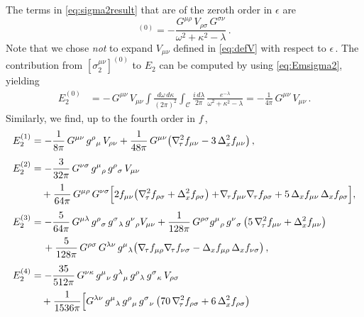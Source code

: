 \documentclass[11pt]{article}
\newcommand{\be}{\begin{equation}}
\newcommand{\ee}{\end{equation}}
\newcommand{\CC}{\mathcal{C}}
\newcommand{\lr}{\left (}
\newcommand{\rr}{\right )}
\begin{document}
The terms in \eqref{eq:sigma2result} that are of the zeroth order in $\epsilon$ are
%
\be
	[\sigma^{\mu\nu}_2]^{(0)} = - \frac{G^{\mu\rho} \, V_{\rho\sigma} \, G^{\sigma\nu}}{\omega^2 + \kappa^2 - \lambda}\,.
\ee
%
Note that we chose \emph{not} to expand $V_{\mu\nu}$ defined in \eqref{eq:defV} with respect to $\epsilon$\,. The contribution from $[\sigma_2^{\mu\nu}]^{(0)}$ to $E_2$ can be computed by using \eqref{eq:Emsigma2}, yielding
%
\begin{align}
	E_2^{(0)} & = - \, G^{\mu\nu} \, V_{\mu\nu} \int \frac{d\omega \, d\kappa}{(2\pi)^2} \int_\CC \frac{i \, d\lambda}{2\pi} \, \frac{e^{-\lambda}}{\omega^2 + \kappa^2 - \lambda}		
		= - \frac{1}{4\pi} \, G^{\mu\nu} \, V_{\mu\nu}\,.
\end{align}
%
Similarly, we find, up to the fourth order in $f$\,, 
%
\begin{subequations} \label{eq:E214}
\begin{align}
	E_2^{(1)} & = - \frac{1}{8\pi} \, G^{\mu\nu} \, g^{\rho}{}_\mu \, V_{\rho\nu} + \frac{1}{48 \pi} \, G^{\mu\nu} \! \lr \nabla_{\!\tau}^2 f_{\mu\nu} - 3 \, \Delta_x^2 f_{\mu\nu} \rr, \\[4pt]
	E_2^{(2)} & = - \frac{3}{32 \pi} \, G^{\nu\sigma} \, g^{\mu}{}_{\rho} \, g^{\rho}{}_{\sigma} \, V_{\mu\nu} \notag \\[2pt]
	 	& \quad + \frac{1}{64\pi} \, G^{\mu\rho} \, G^{\nu\sigma} \Bigl[ 2 f_{\mu\nu} \bigl( \nabla_{\!\tau}^2 f_{\rho\sigma} + \Delta_x^2 f_{\rho\sigma} \bigr) + \! \nabla_{\!\tau} f_{\mu\nu} \nabla_{\!\tau} f_{\rho\sigma} + 5 \, \Delta_x f_{\mu\nu} \, \Delta_x f_{\rho\sigma} \Bigr], \\[4pt]
	E_2^{(3)} & = - \frac{5}{64 \pi} \, G^{\mu\lambda} \, g^\rho{}_\sigma \, g^\sigma{}_\lambda \, g^\nu{}_{\rho} V_{\mu\nu} 
		+ \frac{1}{128\pi} \, G^{\rho\sigma} g^{\mu}{}_{\rho} \, g^\nu{}_\sigma \lr 5 \, \nabla_{\!\tau}^2 f_{\mu\nu} + \Delta_x^2 f_{\mu\nu} \rr \notag \\[2pt]
		& \quad\, + \frac{5}{128 \pi} \, G^{\rho\sigma} \, G^{\lambda\nu} \, g^{\mu}{}_\lambda \bigl( \nabla_{\!\tau} f_{\mu\rho} \nabla_{\!\tau} f_{\nu\sigma} - \Delta_x f_{\mu\rho} \, \Delta_x f_{\nu\sigma} \bigr)\,, \\[4pt]
	E_2^{(4)} & = - \frac{35}{512 \pi} \, G^{\nu\kappa} \, g^{\mu}{}_{\nu} \, g^{\lambda}{}_{\mu} \, g^{\rho}{}_{\lambda} \, g^{\sigma}{}_{\kappa} \, V_{\rho\sigma} \notag \\[2pt]
		& \quad + \frac{1}{1536\pi} \Bigl[ G^{\lambda\nu} \, g^{\mu}{}_{\lambda} \, g^\rho{}_\mu \, g^\sigma{}_\nu \, \bigl( 70 \, \nabla_{\!\tau}^2 f_{\rho\sigma} + 6 \, \Delta_x^2 f_{\rho\sigma} \bigr) \notag \\[2pt]

\end{align}
\end{subequations}
\end{document}
